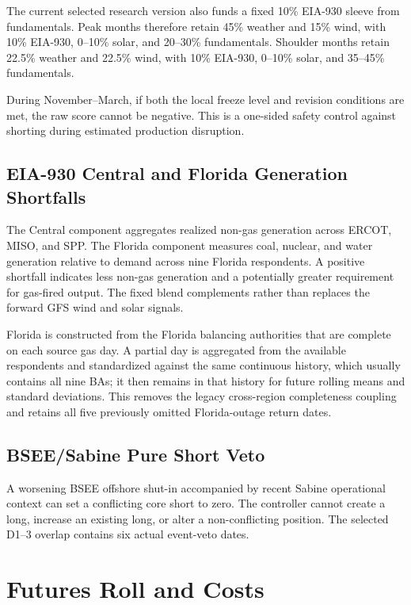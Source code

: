 \documentclass[11pt,a4paper]{article}
\begin{document}
The current selected research version also funds a fixed 10\% EIA-930 sleeve
from fundamentals.
Peak months therefore retain 45\% weather and 15\% wind, with 10\% EIA-930,
0--10\% solar, and 20--30\% fundamentals. Shoulder months retain 22.5\%
weather and 22.5\% wind, with 10\% EIA-930, 0--10\% solar, and 35--45\%
fundamentals.

During November--March, if both the local freeze level and revision conditions
are met, the raw score cannot be negative. This is a one-sided safety control
against shorting during estimated production disruption.

\subsection{EIA-930 Central and Florida Generation Shortfalls}

The Central component aggregates realized non-gas generation across ERCOT,
MISO, and SPP. The Florida component measures coal, nuclear, and water
generation relative to demand across nine Florida respondents. A positive
shortfall indicates less non-gas generation and a potentially greater
requirement for gas-fired output. The fixed blend complements rather than
replaces the forward GFS wind and solar signals.

Florida is constructed from the Florida balancing authorities that are
complete on each source gas day. A partial day is aggregated from the
available respondents and standardized against the same continuous history,
which usually contains all nine BAs; it then remains in that history for
future rolling means and standard deviations. This removes the legacy
cross-region completeness coupling and retains all five previously omitted
Florida-outage return dates.

\subsection{BSEE/Sabine Pure Short Veto}

A worsening BSEE offshore shut-in accompanied by recent Sabine operational
context can set a conflicting core short to zero. The controller cannot create
a long, increase an existing long, or alter a non-conflicting position. The
selected D1--3 overlap contains six actual event-veto dates.

\section{Futures Roll and Costs}
\end{document}
